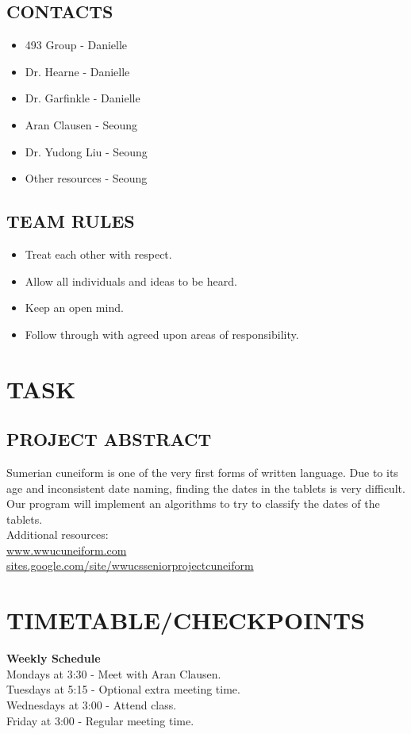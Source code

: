 \documentclass[11pt]{article}
\begin{document}
\subsection{CONTACTS}
\begin{itemize}
\item 493 Group - Danielle
\item Dr. Hearne - Danielle
\item Dr. Garfinkle - Danielle
\item Aran Clausen - Seoung
\item Dr. Yudong Liu - Seoung
\item Other resources - Seoung
\end{itemize}
    
\subsection{TEAM RULES}
\begin{itemize}
\item Treat each other with respect.
\item Allow all individuals and ideas to be heard.
\item Keep an open mind.
\item Follow through with agreed upon areas of responsibility.
\end{itemize}

\section{TASK}
\subsection{PROJECT ABSTRACT}
Sumerian cuneiform is one of the very first forms of written language. Due to its age and inconsistent date naming, finding the dates in the tablets is very difficult. Our program will implement an algorithms to try to classify the dates of the tablets. \\
Additional resources: \\
\url{www.wwucuneiform.com} \\
\url{sites.google.com/site/wwucsseniorprojectcuneiform}

\section{TIMETABLE/CHECKPOINTS}
\textbf{Weekly Schedule}\\
Mondays at 3:30 - Meet with Aran Clausen.\\
Tuesdays at 5:15 - Optional extra meeting time.\\
Wednesdays at 3:00 - Attend class.\\
Friday at 3:00 - Regular meeting time.\\
\end{document}
